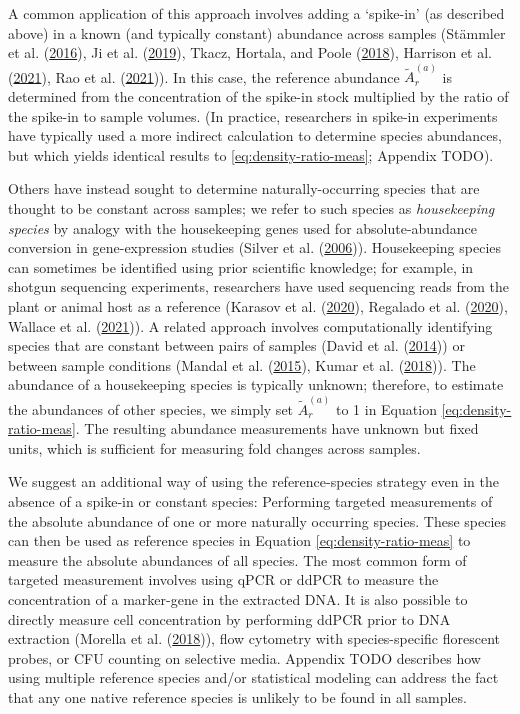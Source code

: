 \documentclass[
]{article}
\begin{document}
A common application of this approach involves adding a `spike-in' (as described above) in a known (and typically constant) abundance across samples (Stämmler et al. (\protect\hyperlink{ref-stammler2016adju}{2016}), Ji et al. (\protect\hyperlink{ref-ji2019quan}{2019}), Tkacz, Hortala, and Poole (\protect\hyperlink{ref-tkacz2018abso}{2018}), Harrison et al. (\protect\hyperlink{ref-harrison2021theq}{2021}), Rao et al. (\protect\hyperlink{ref-rao2021mult}{2021})).
In this case, the reference abundance \(\tilde A_r^{(a)}\) is determined from the concentration of the spike-in stock multiplied by the ratio of the spike-in to sample volumes.
(In practice, researchers in spike-in experiments have typically used a more indirect calculation to determine species abundances, but which yields identical results to \eqref{eq:density-ratio-meas}; Appendix TODO).

Others have instead sought to determine naturally-occurring species that are thought to be constant across samples; we refer to such species as \emph{housekeeping species} by analogy with the housekeeping genes used for absolute-abundance conversion in gene-expression studies (Silver et al. (\protect\hyperlink{ref-silver2006sele}{2006})).
Housekeeping species can sometimes be identified using prior scientific knowledge; for example, in shotgun sequencing experiments, researchers have used sequencing reads from the plant or animal host as a reference (Karasov et al. (\protect\hyperlink{ref-karasov2020ther}{2020}), Regalado et al. (\protect\hyperlink{ref-regalado2020comb}{2020}), Wallace et al. (\protect\hyperlink{ref-wallace2021thed}{2021})).
A related approach involves computationally identifying species that are constant between pairs of samples (David et al. (\protect\hyperlink{ref-david2014host}{2014})) or between sample conditions (Mandal et al. (\protect\hyperlink{ref-mandal2015anal}{2015}), Kumar et al. (\protect\hyperlink{ref-kumar2018anal}{2018})).
The abundance of a housekeeping species is typically unknown; therefore, to estimate the abundances of other species, we simply set \(\tilde A_r^{(a)}\) to 1 in Equation \eqref{eq:density-ratio-meas}.
The resulting abundance measurements have unknown but fixed units, which is sufficient for measuring fold changes across samples.

We suggest an additional way of using the reference-species strategy even in the absence of a spike-in or constant species:
Performing targeted measurements of the absolute abundance of one or more naturally occurring species.
These species can then be used as reference species in Equation \eqref{eq:density-ratio-meas} to measure the absolute abundances of all species.
The most common form of targeted measurement involves using qPCR or ddPCR to measure the concentration of a marker-gene in the extracted DNA.
It is also possible to directly measure cell concentration by performing ddPCR prior to DNA extraction (Morella et al. (\protect\hyperlink{ref-morella2018rapi}{2018})), flow cytometry with species-specific florescent probes, or CFU counting on selective media.
Appendix TODO describes how using multiple reference species and/or statistical modeling can address the fact that any one native reference species is unlikely to be found in all samples.
\end{document}
